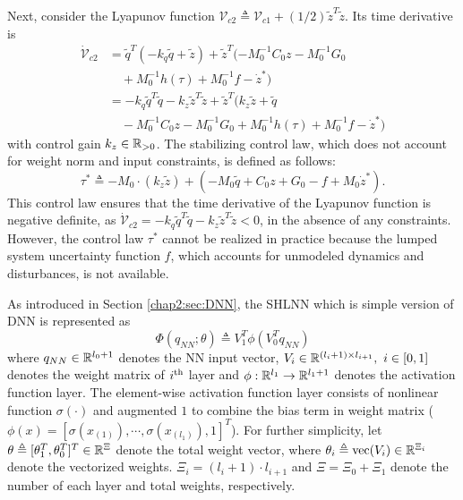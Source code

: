 Next, consider the Lyapunov function ${\mathcal V}_{c2}\triangleq {\mathcal V}_{c1} + (1/2) {\tilde z}^T  {\tilde z}$.
Its time derivative is
\begin{equation}
    \begin{aligned}
    \dot {\mathcal V}_{c2} &=
    {\tilde q}^T  (-{k_q}{\tilde q}+{\tilde z}) +{\tilde z}^T  (-M_0^{-1} C _0{z} -M_0^{-1} G_0\\
    &\quad
    +M_0^{-1}h(\tau)+M_0^{-1} f- \dot z^*)\\
    &= -{k_q}{\tilde q}^T  {\tilde q} -{k_z}{\tilde z}^T  {\tilde z} +{\tilde z}^T  ({k_z}{\tilde z}+{\tilde q}\\
    &\quad-M_0^{-1} C_0{z} -M_0^{-1} G_0+M_0^{-1} h(\tau)+M_0^{-1} f- \dot z^* )
    \end{aligned}
\end{equation}
with control gain ${k_z}\in\mathbb{R}_{>0}$. 
The stabilizing control law, which does not account for weight norm and input constraints, is defined as follows:
\begin{equation}
    \tau^* \triangleq-M_0\cdot ({k_z}{\tilde z})+ 
    ( 
        -M_0{\tilde q}+C_0{z}+G_0-f+M_0 \dot z^*
    )
    .
    \label{chap3:eq:desired_control}
\end{equation}
This control law ensures that the time derivative of the Lyapunov function is negative definite, as $\dot {\mathcal V}_{c2} = -{k_q}{\tilde q}^T  {\tilde q}-{k_z}{\tilde z}^T  {\tilde z}<0$, in the absence of any constraints. 
However, the control law $\tau^*$ cannot be realized in practice because the lumped system uncertainty function $f$, which accounts for unmodeled dynamics and disturbances, is not available.

As introduced in Section \ref{chap2:sec:DNN}, the SHLNN which is simple version of DNN is represented as 
\begin{equation}
    \Phi({q_{NN}};\theta)\triangleq V_1^T\phi(V_0^T{q_{NN}})
\end{equation}
where ${q_{NN}}\in\mathbb{R}^{l_0+1}$ denotes the NN input vector, $V_i\in\mathbb{R}^{(l_i+1)\times l_{i+1}},\ i\in[0,1]$ denotes the weight matrix of $i\textsuperscript{th}$ layer and $\phi:\mathbb{R}^{l_1}\to\mathbb{R}^{l_1+1}$ denotes the activation function layer.
The element-wise activation function layer consists of nonlinear function $\sigma(\cdot)$ and augmented $1$ to combine the bias term in weight matrix (\ie $\phi(x) = [\sigma(x_{(1)}),\cdots, \sigma(x_{(l_1)}), 1]^T$).
For further simplicity, let $\theta\triangleq[\theta_1^T,\theta_0^T]^T\in\mathbb{R}^{\Xi}$ denote the total weight vector, where $\theta_i\triangleq \text{vec}(V_i)\in\mathbb{R}^{\Xi_i}$ denote the vectorized weights.
$\Xi_i=(l_i+1)\cdot l_{i+1}$ and $\Xi=\Xi_0+\Xi_1$ denote the number of each layer and total weights, respectively.

